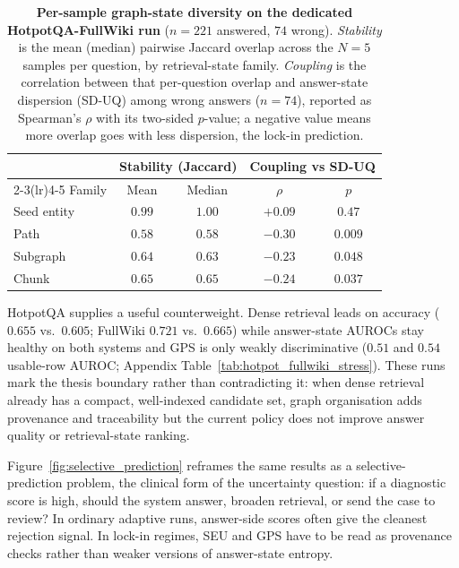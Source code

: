 \begin{table}[t]
\centering
\scriptsize
\caption{%
  \textbf{Per-sample graph-state diversity on the dedicated HotpotQA-FullWiki
  run} ($n=221$ answered, $74$ wrong).
  \emph{Stability} is the mean (median) pairwise Jaccard overlap across the
  $N=5$ samples per question, by retrieval-state family.
  \emph{Coupling} is the correlation between that per-question overlap
  and answer-state dispersion (SD-UQ) among wrong answers ($n=74$), reported as
  Spearman's $\rho$ with its two-sided $p$-value; a negative
  value means more overlap goes with less dispersion, the lock-in prediction.%
}
\label{tab:diversity_run}
\begin{tabular}{@{}lcccc@{}}
\toprule
 & \multicolumn{2}{c}{Stability (Jaccard)} & \multicolumn{2}{c}{Coupling vs SD-UQ} \\
\cmidrule(lr){2-3}\cmidrule(lr){4-5}
Family & Mean & Median & $\rho$ & $p$ \\
\midrule
Seed entity & $0.99$ & $1.00$ & $+0.09$ & $0.47$ \\
Path        & $0.58$ & $0.58$ & $-0.30$ & $0.009$ \\
Subgraph    & $0.64$ & $0.63$ & $-0.23$ & $0.048$ \\
Chunk       & $0.65$ & $0.65$ & $-0.24$ & $0.037$ \\
\bottomrule
\end{tabular}
\end{table}

HotpotQA supplies a useful counterweight.
Dense retrieval leads on accuracy ($0.655$ vs.\ $0.605$; FullWiki $0.721$ vs.\
$0.665$) while answer-state AUROCs stay healthy on both systems and GPS is only
weakly discriminative ($0.51$ and $0.54$ usable-row AUROC; Appendix
Table~\ref{tab:hotpot_fullwiki_stress}).
These runs mark the thesis boundary rather than contradicting it: when dense
retrieval already has a compact, well-indexed candidate set, graph
organisation adds provenance and traceability but the current policy does not
improve answer quality or retrieval-state ranking.

Figure~\ref{fig:selective_prediction} reframes the same results as a
selective-prediction problem, the clinical form of the uncertainty question:
if a diagnostic score is high, should the system answer, broaden retrieval,
or send the case to review?
In ordinary adaptive runs, answer-side scores often give the cleanest
rejection signal.
In lock-in regimes, SEU and GPS have to be read as provenance checks rather
than weaker versions of answer-state entropy.

